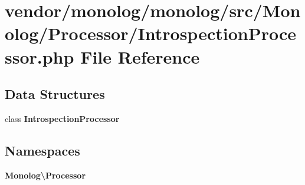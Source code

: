 \section{vendor/monolog/monolog/src/\+Monolog/\+Processor/\+Introspection\+Processor.php File Reference}
\label{_introspection_processor_8php}
\subsection*{Data Structures}
\begin{DoxyCompactItemize}
\item 
class {\bf Introspection\+Processor}
\end{DoxyCompactItemize}
\subsection*{Namespaces}
\begin{DoxyCompactItemize}
\item 
 {\bf Monolog\textbackslash{}\+Processor}
\end{DoxyCompactItemize}
